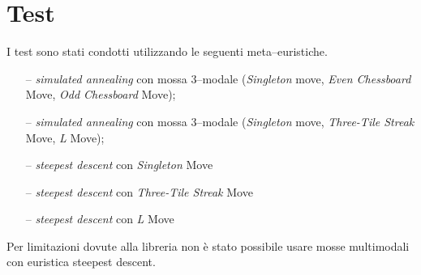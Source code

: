 
\section{Test} %
\label{sec:test}
    
    I test sono stati condotti utilizzando le seguenti meta--euristiche.
    \begin{itemize}
        \item[--] \emph{simulated annealing} con mossa 3--modale (\emph{Singleton} move, \emph{Even Chessboard} Move, \emph{Odd Chessboard} Move);
        \item[--] \emph{simulated annealing} con mossa 3--modale (\emph{Singleton} move, \emph{Three-Tile Streak} Move, \emph{L} Move);
        \item[--] \emph{steepest descent} con \emph{Singleton} Move
        \item[--] \emph{steepest descent} con \emph{Three-Tile Streak} Move
        \item[--] \emph{steepest descent} con \emph{L} Move
    \end{itemize}

    Per limitazioni dovute alla libreria non è stato possibile usare mosse multimodali con euristica steepest descent.

